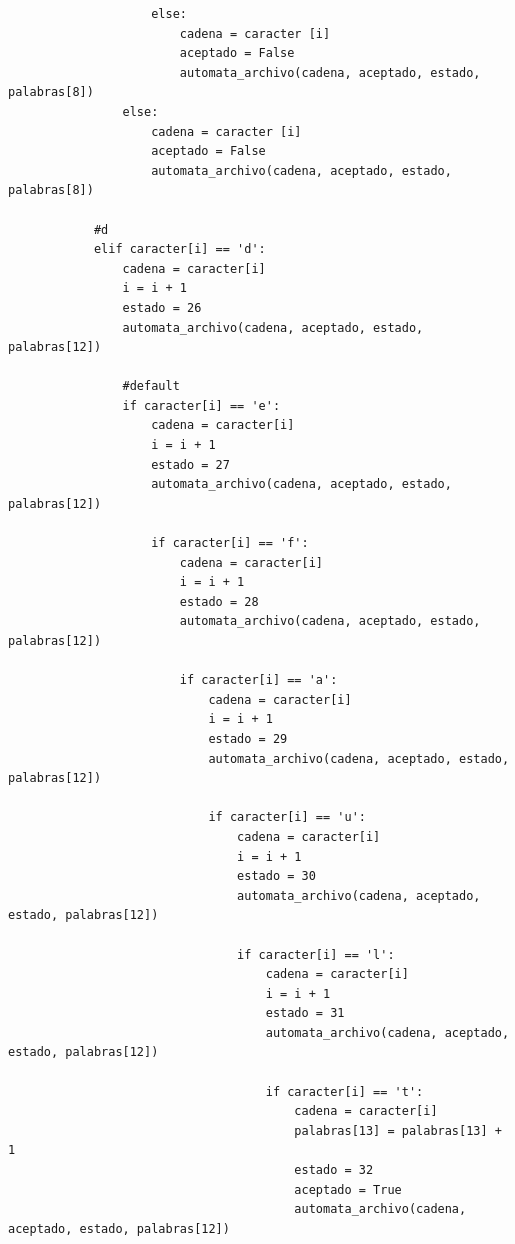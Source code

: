 \documentclass{article}
\begin{document}
\begin{flushleft}
\begin{lstlisting}
                    else:
                        cadena = caracter [i]
                        aceptado = False
                        automata_archivo(cadena, aceptado, estado, palabras[8])
                else:
                    cadena = caracter [i]
                    aceptado = False
                    automata_archivo(cadena, aceptado, estado, palabras[8])
                        
            #d
            elif caracter[i] == 'd':
                cadena = caracter[i]
                i = i + 1
                estado = 26
                automata_archivo(cadena, aceptado, estado, palabras[12])
                
                #default
                if caracter[i] == 'e':
                    cadena = caracter[i]
                    i = i + 1
                    estado = 27
                    automata_archivo(cadena, aceptado, estado, palabras[12])
                    
                    if caracter[i] == 'f':
                        cadena = caracter[i]
                        i = i + 1
                        estado = 28
                        automata_archivo(cadena, aceptado, estado, palabras[12])
                        
                        if caracter[i] == 'a':
                            cadena = caracter[i]
                            i = i + 1
                            estado = 29
                            automata_archivo(cadena, aceptado, estado, palabras[12])
                            
                            if caracter[i] == 'u':
                                cadena = caracter[i]
                                i = i + 1
                                estado = 30
                                automata_archivo(cadena, aceptado, estado, palabras[12])
                                
                                if caracter[i] == 'l':
                                    cadena = caracter[i]
                                    i = i + 1
                                    estado = 31
                                    automata_archivo(cadena, aceptado, estado, palabras[12])
                                    
                                    if caracter[i] == 't':
                                        cadena = caracter[i]
                                        palabras[13] = palabras[13] + 1
                                        estado = 32
                                        aceptado = True
                                        automata_archivo(cadena, aceptado, estado, palabras[12])
                                        

\end{lstlisting}
\end{flushleft}
\end{document}
